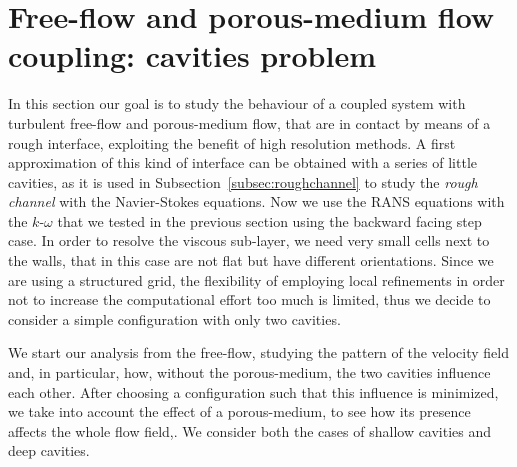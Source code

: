 \FloatBarrier
\section{Free-flow and porous-medium flow coupling: cavities problem}
In this section our goal is to study the behaviour of a coupled system with turbulent free-flow and 
porous-medium flow, that are in contact by means of a rough interface, exploiting the benefit of high resolution methods. A first approximation of this kind of interface can be obtained with a series of little
cavities, as it is used in Subsection~\ref{subsec:roughchannel} to study the \emph{rough channel} with the 
Navier-Stokes equations. Now we use the RANS equations with the 
$k\text{-}\omega$ that we tested in the previous section using the backward 
facing step case.
%
In order to resolve the viscous sub-layer, we need very small cells next to the walls, that in this case are not flat but have different orientations. Since we are using a structured grid, the flexibility of employing local refinements in order not to increase the computational effort too much is limited, thus we decide to consider a simple configuration with only two cavities.

We start our analysis from the free-flow, studying the pattern of the velocity 
field and, in particular, how, without the porous-medium, the two cavities 
influence each other.
After choosing a configuration such that this influence is minimized, we take 
into account the effect of a porous-medium, to see how its presence affects the 
whole flow field,. We consider both the cases of shallow cavities and deep cavities.
%
